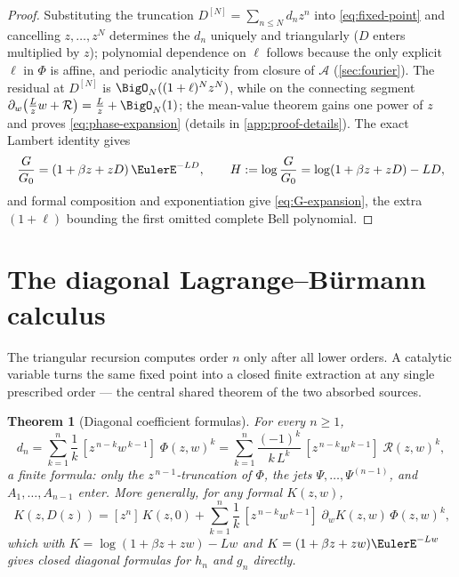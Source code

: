 \documentclass[11pt,oneside]{article}
\numberwithin{equation}{section}
\newtheorem{theorem}{Theorem}[section]
\theoremstyle{definition}
\theoremstyle{remark}
\newcommand{\Gzero}{G_0}
\begin{document}
\begin{proof}
Substituting the truncation $D^{[N]}=\sum_{n\le N}d_nz^{n}$ into
\eqref{eq:fixed-point} and cancelling $z,\dots,z^{N}$ determines the
$d_n$ uniquely and triangularly ($D$ enters multiplied by $z$);
polynomial dependence on $\ell$ follows because the only explicit
$\ell$ in $\Phi$ is affine, and periodic analyticity from closure of
$\mathscr A$ (\cref{sec:fourier}).  The residual at $D^{[N]}$ is
$\BigO_N((1+\ell)^{N}z^{N})$, while on the connecting segment
$\partial_w\bigl(\tfrac Lzw+\mathcal R\bigr)=\tfrac Lz+\BigO_N(1)$;
the mean-value theorem gains one power of $z$ and proves
\eqref{eq:phase-expansion} (details in
\cref{app:proof-details}).  The exact Lambert identity gives
\begin{equation}
 \frac{G}{\Gzero}=(1+\beta z+zD)\,\EulerE^{-LD},
 \qquad
 H:=\log\frac{G}{\Gzero}=\log(1+\beta z+zD)-LD,
 \label{eq:ratio-exact}
\end{equation}
and formal composition and exponentiation give
\eqref{eq:G-expansion}, the extra $(1+\ell)$ bounding the first
omitted complete Bell polynomial.
\end{proof}

\section{The diagonal Lagrange--B\"urmann calculus}
\label{sec:diagonal}

The triangular recursion computes order $n$ only after all lower
orders.  A catalytic variable turns the same fixed point into a
closed finite extraction at any single prescribed order --- the
central shared theorem of the two absorbed sources.

\begin{theorem}[Diagonal coefficient formulas]
\label{thm:diagonal}
For every $n\ge1$,
\begin{equation}
 \boxed{\;
 d_n=\sum_{k=1}^{n}\frac1k\,
 [z^{\,n-k}w^{\,k-1}]\;\Phi(z,w)^{k}
 =\sum_{k=1}^{n}\frac{(-1)^{k}}{k\,L^{k}}\,
 [z^{\,n-k}w^{\,k-1}]\;\mathcal R(z,w)^{k},
 \;}
 \label{eq:diagonal-dn}
\end{equation}
a finite formula: only the $z^{\,n-1}$-truncation of $\Phi$, the jets
$\Psi,\dots,\Psi^{(n-1)}$, and $A_1,\dots,A_{n-1}$ enter.  More
generally, for any formal $K(z,w)$,
\begin{equation}
 [z^{n}]\,K(z,D(z))
 =[z^{n}]\,K(z,0)
 +\sum_{k=1}^{n}\frac1k\,
 [z^{\,n-k}w^{\,k-1}]\;
 \partial_wK(z,w)\,\Phi(z,w)^{k},
 \label{eq:diagonal-composition}
\end{equation}
which with $K=\log(1+\beta z+zw)-Lw$ and
$K=(1+\beta z+zw)\EulerE^{-Lw}$ gives closed diagonal formulas for
$h_n$ and $g_n$ directly.
\end{theorem}
\end{document}
